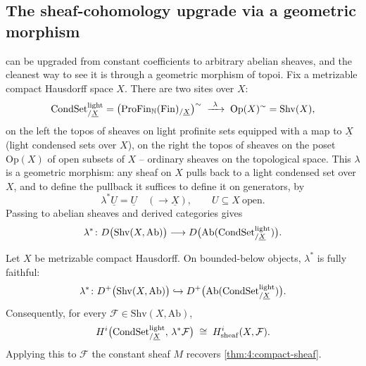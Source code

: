 \subsection{The sheaf-cohomology upgrade via a geometric morphism}

 can be upgraded from constant coefficients to
arbitrary abelian sheaves, and the cleanest way to see it is through a geometric
morphism of topoi. Fix a metrizable compact Hausdorff space $X$. There are two
sites over $X$:
\begin{equation*}
\mathrm{CondSet}^{\mathrm{light}}_{/\underline{X}}
=\bigl(\mathrm{ProFin}_{\mathbb{N}}(\mathrm{Fin})_{/\underline{X}}\bigr)^{\sim}
\;\xrightarrow{\ \lambda\ }\;
\mathrm{Op}(X)^{\sim}=\mathrm{Shv}(X),
\end{equation*}
on the left the topos of sheaves on light profinite sets equipped with a map to
$\underline{X}$ (light condensed sets over $X$), on the right the topos of
sheaves on the poset $\mathrm{Op}(X)$ of open subsets of $X$ -- ordinary
sheaves on the topological space. This $\lambda$ is a geometric morphism: any
sheaf on $X$ pulls back to a light condensed set over $X$, and to define the
pullback it suffices to define it on generators, by
\begin{equation*}
\lambda^{\ast}\underline{U}=\underline{U}\quad(\to\underline{X}),\qquad
U\subseteq X\ \text{open}.
\end{equation*}
Passing to abelian sheaves and derived categories gives
\begin{equation*}
\lambda^{\ast}\colon
D\bigl(\mathrm{Shv}(X,\mathrm{Ab})\bigr)\longrightarrow
D\bigl(\mathrm{Ab}(\mathrm{CondSet}^{\mathrm{light}}_{/\underline{X}})\bigr).
\end{equation*}

\begin{theorem}
\label{thm:4:lambda-fully-faithful}
Let $X$ be metrizable compact Hausdorff. On bounded-below objects, $\lambda^\ast$
is fully faithful:
\[
\lambda^{\ast}\colon D^{+}\bigl(\mathrm{Shv}(X,\mathrm{Ab})\bigr)
\hookrightarrow D^{+}\bigl(\mathrm{Ab}(\mathrm{CondSet}^{\mathrm{light}}_{/\underline{X}})\bigr).
\]
Consequently, for every $\mathcal{F}\in\mathrm{Shv}(X,\mathrm{Ab})$,
\begin{equation*}
H^{i}\bigl(\mathrm{CondSet}^{\mathrm{light}}_{/\underline{X}},\,\lambda^{\ast}\mathcal{F}\bigr)
\;\cong\;
H^{i}_{\mathrm{sheaf}}(X,\mathcal{F}).
\end{equation*}
Applying this to $\mathcal{F}$ the constant sheaf $M$ recovers
\cref{thm:4:compact-sheaf}.
\end{theorem}

